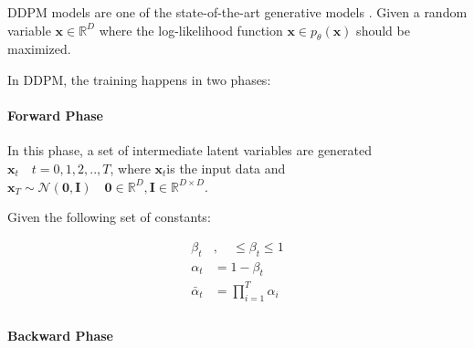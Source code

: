 \documentclass[11pt]{article}
\begin{document}
    DDPM models are one of the state-of-the-art generative models \cite{ho2020denoising}.
    Given a random variable $\mathbf{x} \in \mathbb{R}^{D} $ where the log-likelihood function
    $\mathbf{x} \in p_{\theta}(\mathbf{x})$ should be maximized.\par

    In DDPM, the training happens in two phases:

    \paragraph{Forward Phase}
    In this phase, a set of intermediate latent variables are generated $\mathbf{x}_t \quad t={0,1,2,..,T}$, where
    $\mathbf{x}_t$is the input data and $\mathbf{x}_T \sim \mathcal{N}(\mathbf{0},\mathbf{I})
    \quad \mathbf{0} \in \mathbb{R}^{D}, \mathbf{I} \in \mathbb{R}^{D \times D}$.\par
    Given the following set of constants:


    \begin{equation}
        \begin{aligned}
            \beta_t &, \quad \leq \beta_t \leq 1 \\
            \alpha_t &= 1-\beta_t \\
            \bar{\alpha}_t &= \prod_{i=1}^{T} \alpha_i \\
        \end{aligned}
        \label{eq:ddpm-constants}
    \end{equation}

    \paragraph{Backward Phase}
\end{document}

